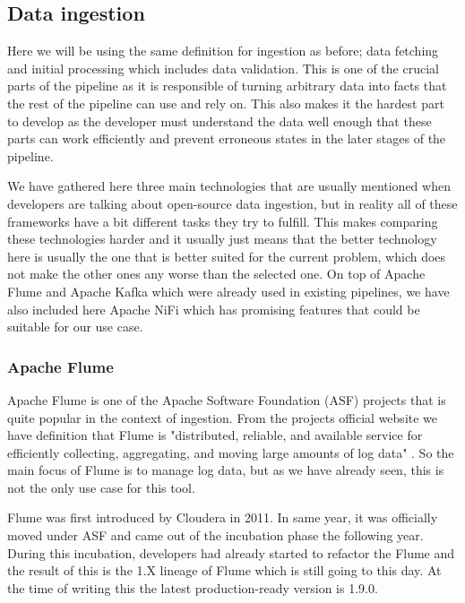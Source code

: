 \subsection{Data ingestion}

Here we will be using the same definition for ingestion as before; data fetching and initial processing which includes data validation.
This is one of the crucial parts of the pipeline as it is responsible of turning arbitrary data into facts that the rest of the pipeline can use and rely on.
This also makes it the hardest part to develop as the developer must understand the data well enough that these parts can work efficiently and prevent erroneous states in the later stages of the pipeline.

We have gathered here three main technologies that are usually mentioned when developers are talking about open-source data ingestion, but in reality all of these frameworks have a bit different tasks they try to fulfill.
This makes comparing these technologies harder and it usually just means that the better technology here is usually the one that is better suited for the current problem, which does not make the other ones any worse than the selected one.
On top of Apache Flume and Apache Kafka which were already used in existing pipelines, we have also included here Apache NiFi which has promising features that could be suitable for our use case.

\subsubsection{Apache Flume}

Apache Flume is one of the Apache Software Foundation (ASF) projects that is quite popular in the context of ingestion.
From the projects official website we have definition that Flume is "distributed, reliable, and available service for efficiently collecting, aggregating, and moving large amounts of log data" \cite{flume}.
So the main focus of Flume is to manage log data, but as we have already seen, this is not the only use case for this tool.

Flume was first introduced by Cloudera in 2011.
In same year, it was officially moved under ASF and came out of the incubation phase the following year.
During this incubation, developers had already started to refactor the Flume and the result of this is the 1.X lineage of Flume which is still going to this day. \cite{hoffman}
At the time of writing this the latest production-ready version is 1.9.0.

